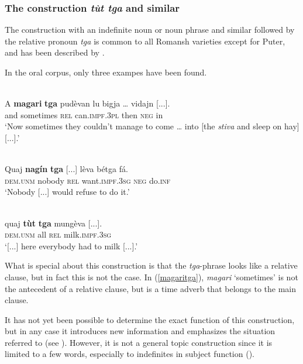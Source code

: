 \subsubsection{The construction \textit{tùt tga} and similar}
The construction with an indefinite noun or noun phrase and similar followed by the relative pronoun \textit{tga} is common to all Romansh varieties except for Puter, and has been described by \citet[185-204]{Linder1987}.

In the oral corpus, only three exampes have been found.

\ea
\label{magaritga}
\\
\gll A  \textbf{magari} \textbf{tga} pudèvan lu bigja … vidajn [...]. \\
and sometimes \textsc{rel} can.\textsc{impf.3pl} then \textsc{neg} {} in\\
\glt `Now sometimes they couldn’t manage to come … into [the \textit{stiva} and sleep on hay] [...].'
\z

\ea

\\
	\gll Quaj \textbf{nagín} \textbf{tga} [...] lèva bétga fá.\\
	 \textsc{dem.unm} nobody \textsc{rel} {}  want.\textsc{impf.3sg} \textsc{neg} do.\textsc{inf}\\
\glt `Nobody [...] would refuse to do it.'
\z

\ea

\\
	\gll [...] quaj \textbf{tùt} \textbf{tga} mungèva [...].  \\
{} \textsc{dem.unm} all \textsc{rel} milk.\textsc{impf.3sg}\\
\glt `[...] here everybody had to milk [...].'
\z

What is special about this construction is that the \textit{tga}-phrase looks like a relative clause, but in fact this is not the case. In (\ref{magaritga}), \textit{magari} `sometimes' is not the antecedent of a relative clause, but is a time adverb that belongs to the main clause.

It has not yet been possible to determine the exact function of this construction, but in any case it introduces new information and emphasizes the situation referred to (see \citet[195-198]{Linder1987}). However, it is not a general topic construction since it is limited to a few words, especially to indefinites in subject function ().

